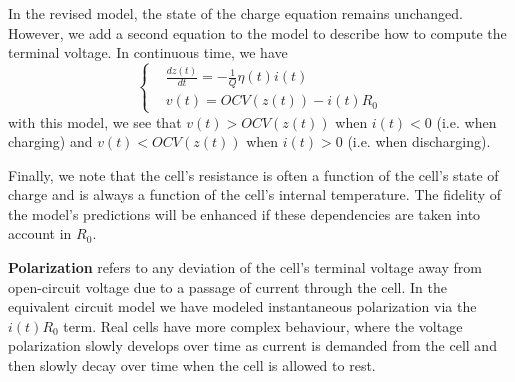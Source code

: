 \documentclass[11pt,a4paper]{article}
\numberwithin{equation}{section}
\theoremstyle{it}
\theoremstyle{definition}
\begin{document}
In the revised model, the state of the charge equation remains unchanged. However, we add a second equation to the model to describe how to compute the terminal voltage. In continuous time, we have
\begin{equation}
	\left\lbrace \begin{aligned}
		&\frac{dz(t)}{dt} = -\frac{1}{Q}\eta(t)i(t) \\[6pt]
		&v(t) = OCV(z(t)) - i(t)R_0
	\end{aligned}\right. 
\end{equation}
with this model, we see that $v(t)>OCV(z(t))$ when $i(t)<0$ (i.e. when charging) and $v(t)<OCV(z(t))$ when $i(t)>0$ (i.e. when discharging). 

Finally, we note that the cell's resistance is often a function of the cell's state of charge and is always a function of the cell's internal temperature. The fidelity of the model's predictions will be enhanced if these dependencies are taken into account in $R_0$.

\textbf{Polarization} refers to any deviation of the cell's terminal voltage away from open-circuit voltage due to a passage of current through the cell. In the equivalent circuit model we have modeled instantaneous polarization via the $i(t)R_0$ term. Real cells have more complex behaviour, where the voltage polarization slowly develops over time as current is demanded from the cell and then slowly decay over time when the cell is allowed to rest.
\end{document}
